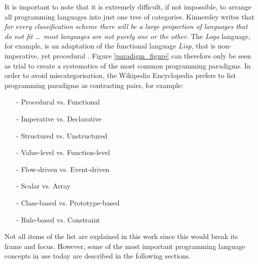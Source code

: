 It is important to note that it is extremely difficult, if not impossible, to
arrange all programming languages into just one tree of categories. Kinnersley
\cite{kinnersley} writes that \textit{for every classification scheme there
will be a large proportion of languages that do not fit \ldots\ most languages
are not purely one or the other}. The \emph{Logo} language, for example, is an
adaptation of the functional language \emph{Lisp}, that is non-imperative, yet
procedural \cite{wikipedia}. Figure \ref{paradigm_figure} can therefore only be
seen as trial to create a systematics of the most common programming paradigms.
In order to avoid miscategorisation, the Wikipedia Encyclopedia \cite{wikipedia}
prefers to list programming paradigms as contrasting pairs, for example:

\begin{itemize}
    \item[-] Procedural vs. Functional
    \item[-] Imperative vs. Declarative
    \item[-] Structured vs. Unstructured
    \item[-] Value-level vs. Function-level
    \item[-] Flow-driven vs. Event-driven
    \item[-] Scalar vs. Array
    \item[-] Class-based vs. Prototype-based
    \item[-] Rule-based vs. Constraint
\end{itemize}

Not all items of the list are explained in this work since this would break its
frame and focus. However, some of the most important programming language
concepts in use today are described in the following sections.
